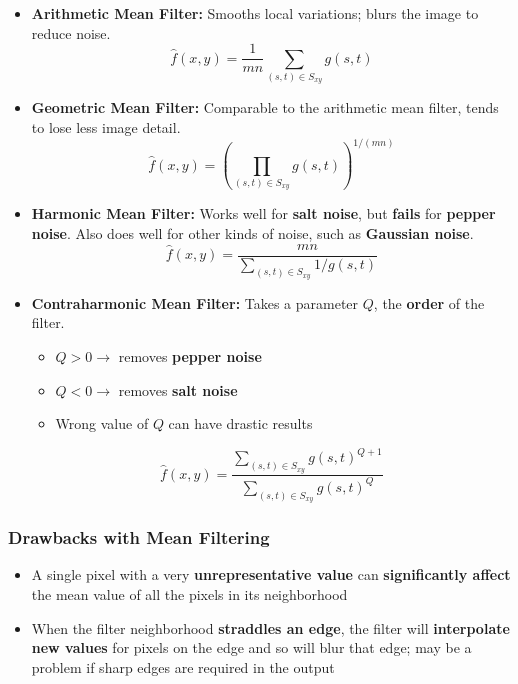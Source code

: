 \begin{itemize}
  \item \textbf{Arithmetic Mean Filter:} Smooths local variations;
    blurs the image to reduce noise.
    \begin{equation*}
      \hat{f}(x, y) = \frac{1}{mn} \sum_{(s, t) \in S_{xy}} g(s, t)
    \end{equation*}

  \item \textbf{Geometric Mean Filter:} Comparable to the arithmetic
    mean filter, tends to lose less image detail.
    \begin{equation*}
      \hat{f}(x, y) = \left( \prod_{(s, t) \in S_{xy}} g(s, t) \right)^{1/(mn)}
    \end{equation*}

  \item \textbf{Harmonic Mean Filter:} Works well for \textbf{salt
    noise}, but \textbf{fails} for \textbf{pepper noise}. Also does
    well for other kinds of noise, such as \textbf{Gaussian noise}.
    \begin{equation*}
      \hat{f}(x, y) = \frac{mn}{\sum_{(s, t) \in S_{xy}} 1/g(s, t)}
    \end{equation*}

  \item \textbf{Contraharmonic Mean Filter:} Takes a parameter $Q$,
    the \textbf{order} of the filter.
    \begin{itemize}
      \item $Q > 0 \rightarrow$ removes \textbf{pepper noise}
      \item $Q < 0 \rightarrow$ removes \textbf{salt noise}
      \item Wrong value of $Q$ can have drastic results
    \end{itemize}

    \begin{equation*}
      \hat{f}(x, y) = \frac{\sum_{(s, t) \in S_{xy}} g(s, t)^{Q +
      1}}{\sum_{(s, t) \in S_{xy}} g(s, t)^Q}
    \end{equation*}
\end{itemize}

\subsubsection*{Drawbacks with Mean Filtering}

\begin{itemize}
  \item A single pixel with a very \textbf{unrepresentative value}
    can \textbf{significantly affect} the mean value of all the
    pixels in its neighborhood
  \item When the filter neighborhood \textbf{straddles an edge}, the
    filter will \textbf{interpolate new values} for pixels on the
    edge and so will blur that edge; may be a problem if sharp edges
    are required in the output
\end{itemize}

